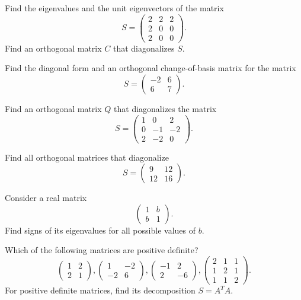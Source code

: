 \begin{problem}
Find the eigenvalues and the unit eigenvectors of the matrix 
$$
S=\begin{pmatrix}
    2 & 2 & 2 \\
    2 & 0 & 0 \\
    2 & 0 & 0
    \end{pmatrix}.
$$
Find an orthogonal matrix $C$ that diagonalizes $S$.
\end{problem}

\begin{problem}
Find the diagonal form and an orthogonal change-of-basis matrix for the matrix 
$$S=\begin{pmatrix}-2 & 6 \\ 6 & 7\end{pmatrix}.$$
\end{problem}

\begin{problem}
Find an orthogonal matrix $Q$ that diagonalizes the matrix
$$
S=\begin{pmatrix}
1 & 0 & 2 \\
0 & -1 & -2 \\
2 & -2 & 0
\end{pmatrix}.
$$
\end{problem}

\begin{problem}
Find all orthogonal matrices that diagonalize 
$$
S=\begin{pmatrix}9 & 12 \\ 12 & 16\end{pmatrix}.
$$
\end{problem}

\begin{problem}
Consider a real matrix
$$
\begin{pmatrix}
1 & b \\
b & 1
\end{pmatrix}.
$$
Find signs of its eigenvalues for all possible values of $b$.
\end{problem}

\begin{problem}
Which of the following matrices are positive definite?
$$
\begin{pmatrix}
1 & 2 \\
2 & 1
\end{pmatrix},
\begin{pmatrix}
1 & -2 \\
-2 & 6
\end{pmatrix},
\begin{pmatrix}
-1 & 2 \\
2 & -6
\end{pmatrix},
\begin{pmatrix}
2 & 1 & 1\\
1 & 2 & 1\\
1 & 1 & 2
\end{pmatrix}.
$$
For positive definite matrices, find its decomposition $S = A^T A$.
\end{problem}

